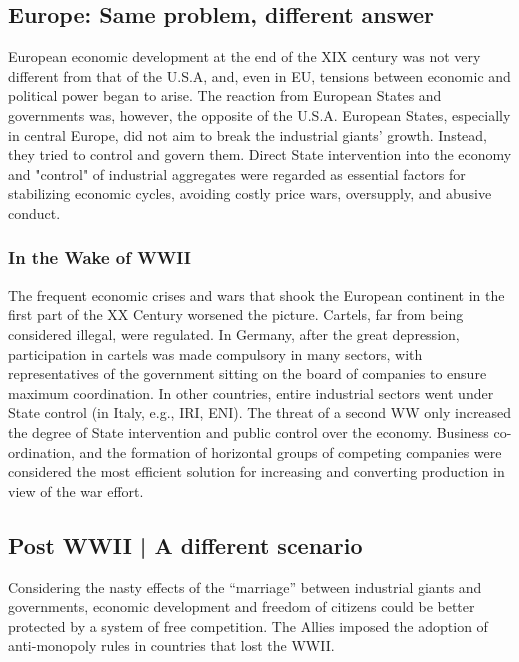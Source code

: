    \subsection{Europe: Same problem, different answer}

        European economic development at the end of the XIX century was not very different from that of the U.S.A, and, even in EU, tensions between economic and political power began to arise.
        The reaction from European States and governments was, however, the opposite of the U.S.A. European States, especially in central Europe, did not aim to break the industrial giants’ growth. Instead, they tried to control and govern them.
        Direct State intervention into the economy and "control" of industrial aggregates were regarded as essential factors for stabilizing economic cycles, avoiding costly price wars, oversupply, and abusive conduct. 

        \subsubsection{In the Wake of WWII}

            The frequent economic crises and wars that shook the European continent in the first part of the XX Century worsened the picture. Cartels, far from being considered illegal, were regulated. 
            In Germany, after the great depression, participation in cartels was made compulsory in many sectors, with representatives of the government sitting on the board of companies to ensure maximum coordination.  
            In other countries, entire industrial sectors went under State control (in Italy, e.g., IRI, ENI).
            The threat of a second WW only increased the degree of State intervention and public control over the economy. Business co-ordination, and the formation of horizontal groups of competing companies were considered the most efficient solution for increasing and converting production in view of the war effort. 

    \subsection{Post WWII | A different scenario}

        Considering the nasty effects of the “marriage” between industrial giants and governments, economic development and freedom of citizens could be better protected by a system of free competition.
        The Allies imposed the adoption of anti-monopoly rules in countries that lost the WWII. 

